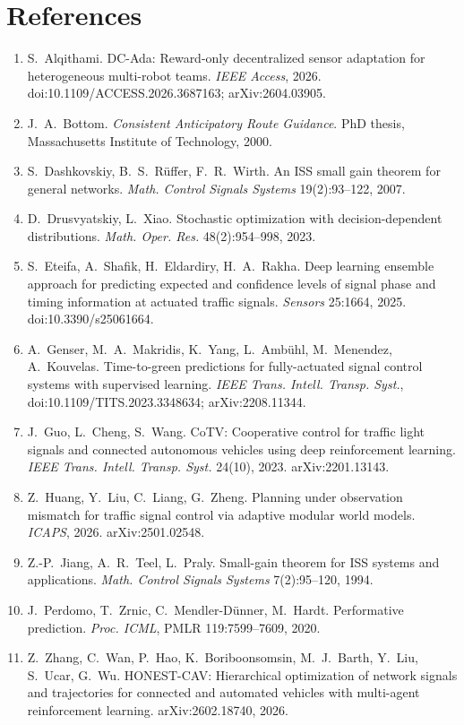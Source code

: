 \documentclass[11pt]{article}
\begin{document}
\section*{References}
\small
\begin{enumerate}\setlength\itemsep{1pt}
\renewcommand{\labelenumi}{[\arabic{enumi}]}
\item S.~Alqithami. DC-Ada: Reward-only decentralized sensor adaptation for heterogeneous multi-robot teams. \emph{IEEE Access}, 2026.
doi:10.1109/ACCESS.2026.3687163; arXiv:2604.03905.
\item J.~A.~Bottom. \emph{Consistent Anticipatory Route Guidance}. PhD thesis, Massachusetts Institute of Technology, 2000.
\item S.~Dashkovskiy, B.~S.~R\"uffer, F.~R.~Wirth. An ISS small gain theorem for general networks. \emph{Math. Control Signals Systems}
19(2):93--122, 2007.
\item D.~Drusvyatskiy, L.~Xiao. Stochastic optimization with decision-dependent distributions. \emph{Math. Oper. Res.} 48(2):954--998, 2023.
\item S.~Eteifa, A.~Shafik, H.~Eldardiry, H.~A.~Rakha. Deep learning ensemble approach for predicting expected and confidence levels of
signal phase and timing information at actuated traffic signals. \emph{Sensors} 25:1664, 2025. doi:10.3390/s25061664.
\item A.~Genser, M.~A.~Makridis, K.~Yang, L.~Amb\"uhl, M.~Menendez, A.~Kouvelas. Time-to-green predictions for fully-actuated signal
control systems with supervised learning. \emph{IEEE Trans. Intell. Transp. Syst.}, doi:10.1109/TITS.2023.3348634; arXiv:2208.11344.
\item J.~Guo, L.~Cheng, S.~Wang. CoTV: Cooperative control for traffic light signals and connected autonomous vehicles using deep
reinforcement learning. \emph{IEEE Trans. Intell. Transp. Syst.} 24(10), 2023. arXiv:2201.13143.
\item Z.~Huang, Y.~Liu, C.~Liang, G.~Zheng. Planning under observation mismatch for traffic signal control via adaptive modular world
models. \emph{ICAPS}, 2026. arXiv:2501.02548.
\item Z.-P.~Jiang, A.~R.~Teel, L.~Praly. Small-gain theorem for ISS systems and applications. \emph{Math. Control Signals Systems}
7(2):95--120, 1994.
\item J.~Perdomo, T.~Zrnic, C.~Mendler-D\"unner, M.~Hardt. Performative prediction. \emph{Proc. ICML}, PMLR 119:7599--7609, 2020.
\item Z.~Zhang, C.~Wan, P.~Hao, K.~Boriboonsomsin, M.~J.~Barth, Y.~Liu, S.~Ucar, G.~Wu. HONEST-CAV: Hierarchical optimization of network
signals and trajectories for connected and automated vehicles with multi-agent reinforcement learning. arXiv:2602.18740, 2026.
\end{enumerate}
\normalsize
\end{document}
